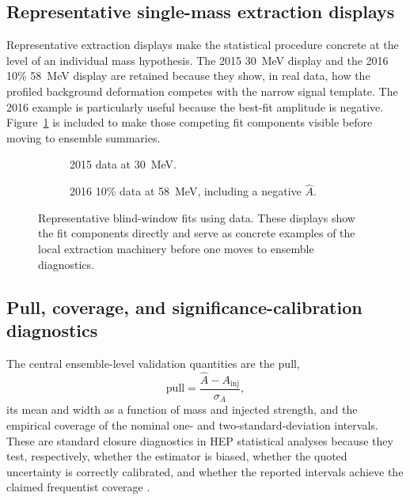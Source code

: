\subsection{Representative single-mass extraction displays}

Representative extraction displays make the statistical procedure concrete at the level
of an individual mass hypothesis. The 2015 \SI{30}{MeV} display and the 2016 10\%
\SI{58}{MeV} display are retained because they show, in real data, how the profiled
background deformation competes with the narrow signal template. The 2016 example is
particularly useful because the best-fit amplitude is negative.
Figure~\ref{fig:data-fit-examples} is included to make those competing fit components
visible before moving to ensemble summaries.

\begin{figure}[h!]
\centering
\begin{subfigure}[t]{0.88\linewidth}
  \centering
  \caption{2015 data at \SI{30}{MeV}.}
\end{subfigure}

\vspace{1.0em}

\begin{subfigure}[t]{0.88\linewidth}
  \centering
  \caption{2016 10\% data at \SI{58}{MeV}, including a negative $\hat A$.}
\end{subfigure}
\caption{Representative blind-window fits using data. These displays show the fit
components directly and serve as concrete examples of the local extraction machinery
before one moves to ensemble diagnostics.}
\label{fig:data-fit-examples}
\end{figure}

\subsection{Pull, coverage, and significance-calibration diagnostics}

The central ensemble-level validation quantities are the pull,
\begin{equation}
\mathrm{pull} = \frac{\hat A - A_{\mathrm{inj}}}{\sigma_A},
\end{equation}
its mean and width as a function of mass and injected strength, and the empirical
coverage of the nominal one- and two-standard-deviation intervals. These are standard
closure diagnostics in HEP statistical analyses because they test, respectively,
whether the estimator is biased, whether the quoted uncertainty is correctly calibrated,
and whether the reported intervals achieve the claimed frequentist coverage
\cite{Cowan1998,Cowan2011}.

